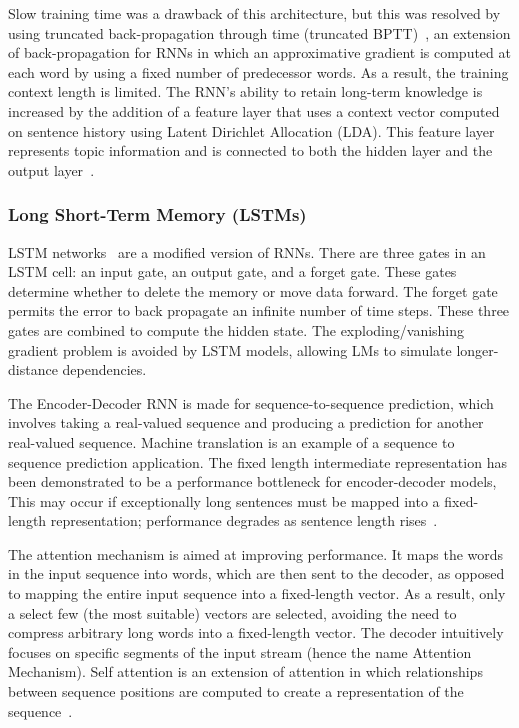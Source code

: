 Slow training time was a drawback of this architecture, but this was resolved by using truncated back-propagation through time (truncated BPTT)~\cite{rnn}, an extension of back-propagation for RNNs in which an approximative gradient is computed at each word by using a fixed number of predecessor words.  As a result, the training context length is limited. The RNN's ability to retain long-term knowledge is increased by the addition of a feature layer that uses a context vector computed on sentence history using Latent Dirichlet Allocation (LDA). This feature layer represents topic information and is connected to both the hidden layer and the output layer~\cite{mikolov-rnn}.

\subsubsection{Long Short-Term Memory (LSTMs)}
LSTM networks~\cite{lstm} are a modified version of RNNs. There are three gates in an LSTM cell: an input gate, an output gate, and a forget gate. These gates determine whether to delete the memory or move data forward. The forget gate permits the error to back propagate an infinite number of time steps. These three gates are combined to compute the hidden state. The exploding/vanishing gradient problem is avoided by LSTM models, allowing LMs to simulate longer-distance dependencies.

The Encoder-Decoder RNN is made for sequence-to-sequence prediction, which involves taking a real-valued sequence and producing a prediction for another real-valued sequence. Machine translation is an example of a sequence to sequence prediction application. The fixed length intermediate representation has been demonstrated to be a performance bottleneck for encoder-decoder models, This may occur if exceptionally long sentences must be mapped into a fixed-length representation; performance degrades as sentence length rises~\cite{encoder}.

The attention mechanism is aimed at improving performance. It maps the words in the input sequence into words, which are then sent to the decoder, as opposed to mapping the entire input sequence into a fixed-length vector. As a result, only a select few (the most suitable) vectors are selected, avoiding the need to compress arbitrary long words into a fixed-length vector. The decoder intuitively focuses on specific segments of the input stream (hence the name Attention Mechanism). Self attention is an extension of attention in which relationships between sequence positions are computed to create a representation of the sequence~\cite{attention}.

